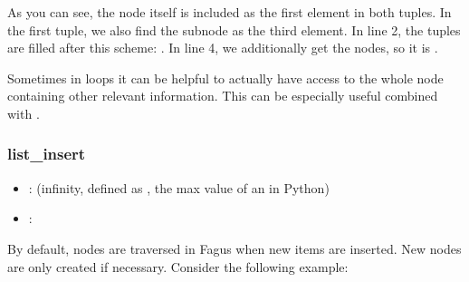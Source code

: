 \documentclass[a4paper,10pt,english]{sphinxmanual}
\begin{document}
\sphinxAtStartPar
As you can see, the node itself is included as the first element in both tuples. In the first tuple, we also find the subnode  as the third element. In line 2, the tuples are filled after this scheme: . In line 4, we additionally get the nodes, so it is .

\sphinxAtStartPar
Sometimes in loops it can be helpful to actually have access to the whole node containing other relevant information. This can be especially useful combined with {\hyperref[\detokenize{README:skipping-nodes-in-iteration}]{}}.


\subsubsection{list\_insert}
\label{\detokenize{README:list-insert}}\begin{itemize}
\item {}
\sphinxAtStartPar
{}:  (infinity, defined as , the max value of an  in Python)

\item {}
\sphinxAtStartPar
{}: 

\end{itemize}

\sphinxAtStartPar
By default, \sphinxhyphen{}nodes are traversed in Fagus when new items are inserted. New \sphinxhyphen{}nodes are only created if necessary. Consider the following example:

\begin{sphinxVerbatim}[commandchars=\\\{\},numbers=left,firstnumber=1,stepnumber=1]
  \PYG{p}{[} \PYG{p}{[}  \PYG{p}{[} \PYG{p}{]} \PYG{p}{]}\PYG{p}{]}
  
\end{sphinxVerbatim}
\end{document}
